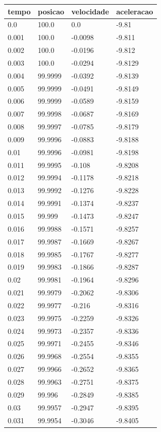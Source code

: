 \begin{tabular}{llll}
\toprule
tempo & posicao & velocidade & aceleracao \\
\midrule
0.0 & 100.0 & 0.0 & -9.81 \\
0.001 & 100.0 & -0.0098 & -9.811 \\
0.002 & 100.0 & -0.0196 & -9.812 \\
0.003 & 100.0 & -0.0294 & -9.8129 \\
0.004 & 99.9999 & -0.0392 & -9.8139 \\
0.005 & 99.9999 & -0.0491 & -9.8149 \\
0.006 & 99.9999 & -0.0589 & -9.8159 \\
0.007 & 99.9998 & -0.0687 & -9.8169 \\
0.008 & 99.9997 & -0.0785 & -9.8179 \\
0.009 & 99.9996 & -0.0883 & -9.8188 \\
0.01 & 99.9996 & -0.0981 & -9.8198 \\
0.011 & 99.9995 & -0.108 & -9.8208 \\
0.012 & 99.9994 & -0.1178 & -9.8218 \\
0.013 & 99.9992 & -0.1276 & -9.8228 \\
0.014 & 99.9991 & -0.1374 & -9.8237 \\
0.015 & 99.999 & -0.1473 & -9.8247 \\
0.016 & 99.9988 & -0.1571 & -9.8257 \\
0.017 & 99.9987 & -0.1669 & -9.8267 \\
0.018 & 99.9985 & -0.1767 & -9.8277 \\
0.019 & 99.9983 & -0.1866 & -9.8287 \\
0.02 & 99.9981 & -0.1964 & -9.8296 \\
0.021 & 99.9979 & -0.2062 & -9.8306 \\
0.022 & 99.9977 & -0.216 & -9.8316 \\
0.023 & 99.9975 & -0.2259 & -9.8326 \\
0.024 & 99.9973 & -0.2357 & -9.8336 \\
0.025 & 99.9971 & -0.2455 & -9.8346 \\
0.026 & 99.9968 & -0.2554 & -9.8355 \\
0.027 & 99.9966 & -0.2652 & -9.8365 \\
0.028 & 99.9963 & -0.2751 & -9.8375 \\
0.029 & 99.996 & -0.2849 & -9.8385 \\
0.03 & 99.9957 & -0.2947 & -9.8395 \\
0.031 & 99.9954 & -0.3046 & -9.8405 \\

\end{tabular}
